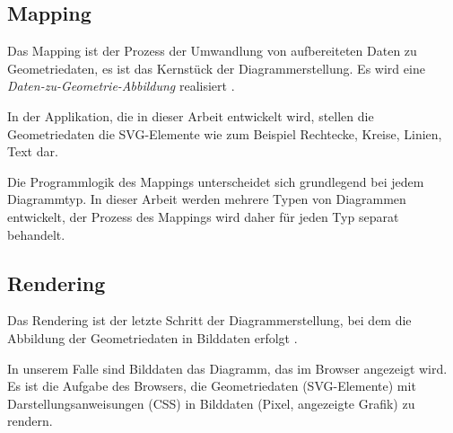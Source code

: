 \subsection{Mapping}

Das Mapping ist der Prozess der Umwandlung von aufbereiteten Daten zu Geometriedaten, es ist das Kernstück der Diagrammerstellung. Es wird eine \textit{Daten-zu-Geometrie-Abbildung} realisiert \cite[Kapitel 2.1]{viz}.

In der Applikation, die in dieser Arbeit entwickelt wird, stellen die Geometriedaten die SVG-Elemente wie zum Beispiel Rechtecke, Kreise, Linien, Text dar.

Die Programmlogik des Mappings unterscheidet sich grundlegend bei jedem Diagrammtyp. In dieser Arbeit werden mehrere Typen von Diagrammen entwickelt, der Prozess des Mappings wird daher für jeden Typ separat behandelt.

\subsection{Rendering}


Das Rendering ist der letzte Schritt der Diagrammerstellung, bei dem die Abbildung der Geometriedaten in Bilddaten erfolgt \cite[Kapitel 2.1]{viz}.

In unserem Falle sind Bilddaten das Diagramm, das im Browser angezeigt wird. Es ist die Aufgabe des Browsers, die Geometriedaten (SVG-Elemente) mit Darstellungsanweisungen (CSS) in Bilddaten (Pixel, angezeigte Grafik) zu rendern.
